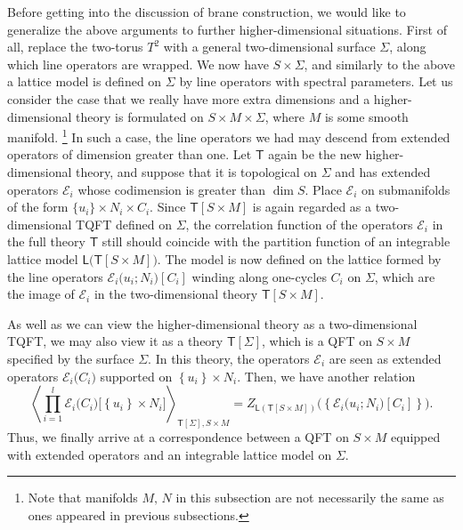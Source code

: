 Before getting into the discussion of brane construction, we would like
to generalize the above arguments to further higher-dimensional situations.
First of all, replace the two-torus $T^{2}$ with a general two-dimensional
surface $\Sigma$, along which line operators are wrapped. We now
have $S\times\Sigma$, and similarly to the above a lattice model
is defined on $\Sigma$ by line operators with spectral parameters.
Let us consider the case that we really have more extra dimensions
and a higher-dimensional theory is formulated on $S\times M\times\Sigma$,
where $M$ is some smooth manifold.%
\footnote{Note that manifolds $M,\, N$ in this subsection are not necessarily the same as ones appeared in
previous subsections.}
%
In such a case, the line operators we had may
descend from extended operators of dimension greater than one. Let
$\mathsf{T}$ again be the new higher-dimensional theory, and suppose
that it is topological on $\Sigma$ and has extended operators $\mathcal{E}_{i}$
whose codimension is greater than $\dim S$. Place $\mathcal{E}_{i}$
on submanifolds of the form $\{ u_{i}\} \times N_{i}\times C_{i}$.
Since $\mathsf{T}[S\times M]$ is again regarded as a two-dimensional
TQFT defined on $\Sigma$, the correlation function of the operators
$\mathcal{E}_{i}$ in the full theory $\mathsf{T}$ still should coincide with the partition function
of an integrable lattice model $\mathsf{L}\big(\mathsf{T}[S\times M]\big)$.
The model is now defined on the lattice formed by the line operators
$\mathcal{E}_{i}\big(u_{i}; N_{i}\big)[C_i]$ winding along one-cycles $C_i$ on $\Sigma$,
which are the image of $\mathcal{E}_{i}$ in the two-dimensional theory
$\mathsf{T}[S\times M]$.

As well as we can view the higher-dimensional theory as a two-dimensional
TQFT, we may also view it as a theory $\mathsf{T}[\Sigma]$,
which is a QFT on $S\times M$ specified by the surface $\Sigma$.
In this theory, the operators $\mathcal{E}_{i}$ are seen as extended
operators $\mathcal{E}_{i}\big(C_{i}\big)$ supported on $\left\{ u_{i}\right\} \times N_{i}$.
Then, we have another relation
\begin{equation}
  \left\langle
    \prod_{i=1}^{l} \mathcal{E}_{i}\big(C_{i}\big)
    \big[\left\{ u_{i}\right\} \times N_{i}\big]
      \right\rangle_{\mathsf{T}\left[\Sigma\right],S\times M}
    =
      Z_{\mathsf{L}(\mathsf{T}[S\times M])}
        \big(\left\{ \mathcal{E}_{i}\big(u_{i}; N_{i}\big)[C_i]\right\})
    .
  \label{eq:correspondence_0}
\end{equation}
Thus, we finally arrive at a correspondence between a QFT on $S\times M$
equipped with extended operators and an integrable lattice model on
$\Sigma$.







